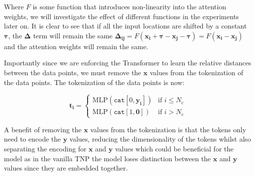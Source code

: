 \documentclass[../../main.tex]{subfiles}
\begin{document}
Where $F$ is some function that introduces non-linearity into the attention weights, we will investigate the effect of different functions in the experiments later on. It is clear to see that if all the input locations are shifted by a constant $\bm{\tau}$, the $\bm{\Delta}$ term will remain the same $\bm{\Delta_{ij}} = F(\bm{x_i} + \bm{\tau} - \bm{x_j} - \bm{\tau}) = F(\bm{x_i} - \bm{x_j})$ and the attention weights will remain the same.

Importantly since we are enforcing the Transformer to learn the relative distances between the data points, we must remove the $\bm{x}$ values from the tokenization of the data points. The tokenization of the data points is now:

\[
	\bm{t_i} = \begin{cases}
		\text{MLP}(\texttt{cat}[0, \bm{y_i}]) & \text{if } i \leq N_c \\
		\text{MLP}(\texttt{cat}[1, \bm{ 0}]) & \text{if } i > N_c
	\end{cases}
\]




A benefit of removing the $\bm{x}$ values from the tokenization is that the tokens only need to encode the $\bm{y}$ values, reducing the dimensionality of the tokens whilst also separating the encoding for $\bm{x}$ and $\bm{y}$ values which could be beneficial for the model as in the vanilla TNP the model loses distinction between the $\bm{x}$ and $\bm{y}$ values since they are embedded together.









\end{document}

